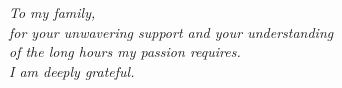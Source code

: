 \cleardoublepage
\thispagestyle{empty}
\vspace*{0.3\textheight}
\begin{center}
    \itshape
    To my family, \\
    for your unwavering support and your understanding \\
    of the long hours my passion requires. \\
    \medskip
    I am deeply grateful.
\end{center}
\vfill
